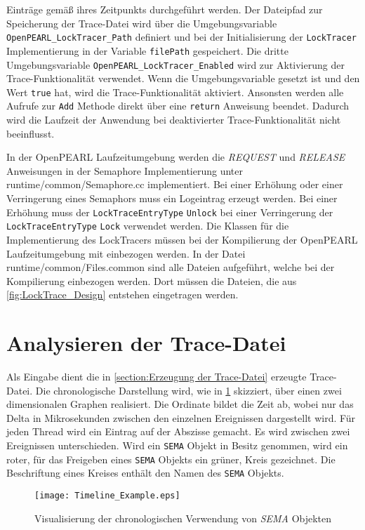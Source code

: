 Einträge gemäß ihres Zeitpunkts durchgeführt werden. Der Dateipfad zur
Speicherung der Trace-Datei wird über die Umgebungsvariable
\texttt{OpenPEARL\_LockTracer\_Path} definiert und bei der Initialisierung der
\texttt{LockTracer} Implementierung in der Variable \texttt{filePath}
gespeichert. Die dritte Umgebungsvariable
\texttt{OpenPEARL\_LockTracer\_Enabled} wird zur Aktivierung der
Trace-Funktionalität verwendet. Wenn die Umgebungsvariable gesetzt ist und den
Wert \texttt{true} hat, wird die Trace-Funktionalität aktiviert. Ansonsten
werden alle Aufrufe zur \texttt{Add} Methode direkt über eine \texttt{return}
Anweisung beendet. Dadurch wird die Laufzeit der Anwendung bei deaktivierter
Trace-Funktionalität nicht beeinflusst.

In der OpenPEARL Laufzeitumgebung werden die \textit{REQUEST} und
\textit{RELEASE} Anweisungen in der Semaphore Implementierung unter
runtime/common/Semaphore.cc implementiert. Bei einer Erhöhung oder einer
Verringerung eines Semaphors muss ein Logeintrag erzeugt werden. Bei einer
Erhöhung muss der \texttt{LockTraceEntryType} \texttt{Unlock} bei einer
Verringerung der \texttt{LockTraceEntryType} \texttt{Lock} verwendet werden. Die
Klassen für die Implementierung des LockTracers müssen bei der Kompilierung der
OpenPEARL Laufzeitumgebung mit einbezogen werden. In der Datei
runtime/common/Files.common sind alle Dateien aufgeführt, welche bei der
Kompilierung einbezogen werden. Dort müssen die Dateien, die aus
\cref{fig:LockTrace_Design} entstehen eingetragen werden.


\section{Analysieren der Trace-Datei}
\label{section:Analysieren der Trace-Datei}
Als Eingabe dient die in \cref{section:Erzeugung der Trace-Datei} erzeugte
Trace-Datei. Die chronologische Darstellung wird, wie in
\cref{fig:Timeline_Example} skizziert, über einen zwei dimensionalen Graphen
realisiert. Die Ordinate bildet die Zeit ab, wobei nur das Delta in
Mikrosekunden zwischen den einzelnen Ereignissen dargestellt wird. Für jeden
Thread wird ein Eintrag auf der Abszisse gemacht. Es wird zwischen zwei
Ereignissen unterschieden. Wird ein \texttt{SEMA} Objekt in Besitz genommen,
wird ein roter, für das Freigeben eines \texttt{SEMA} Objekts ein grüner, Kreis
gezeichnet. Die Beschriftung eines Kreises enthält den Namen des \texttt{SEMA}
Objekts.

\begin{figure}[ht]
  \texttt{[image: Timeline\_Example.eps]}
  \caption{Visualisierung der chronologischen Verwendung von \textit{SEMA} Objekten}
  \label{fig:Timeline_Example}
\end{figure}

